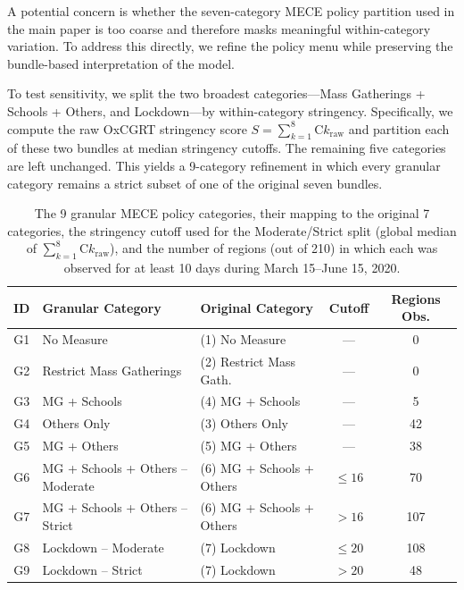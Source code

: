\documentclass[msom,blindrev]{informs3} %
\newcommand{\rev}[1]{{\color{blue}#1}}
\begin{document}
\begin{APPENDICES}
{A potential concern is whether the seven-category MECE policy partition used in the main paper is too coarse and therefore masks meaningful within-category variation. To address this directly, we refine the policy menu while preserving the bundle-based interpretation of the model.

To test sensitivity, we split the two broadest categories---Mass Gatherings + Schools + Others, and Lockdown---by within-category stringency. Specifically, we compute the raw OxCGRT stringency score $S = \sum_{k=1}^{8} \text{C}k_{\text{raw}}$ and partition each of these two bundles at median stringency cutoffs. The remaining five categories are left unchanged. This yields a 9-category refinement in which every granular category remains a strict subset of one of the original seven bundles.


\begin{table}[htbp!]
\centering
{\color{blue}\small
\begin{tabular}{|c|l|l|c|c|}
\hline
\textbf{ID} & \textbf{Granular Category} & \textbf{Original Category} & \textbf{Cutoff} & \textbf{Regions Obs.} \\\hline
G1 & No Measure & (1) No Measure & --- & 0 \\
G2 & Restrict Mass Gatherings & (2) Restrict Mass Gath. & --- & 0 \\
G3 & MG + Schools & (4) MG + Schools & --- & 5 \\
G4 & Others Only & (3) Others Only & --- & 42 \\
G5 & MG + Others & (5) MG + Others & --- & 38 \\
G6 & MG + Schools + Others -- Moderate & (6) MG + Schools + Others & $\leq 16$ & 70 \\
G7 & MG + Schools + Others -- Strict & (6) MG + Schools + Others & $> 16$ & 107 \\
G8 & Lockdown -- Moderate & (7) Lockdown & $\leq 20$ & 108 \\
G9 & Lockdown -- Strict & (7) Lockdown & $> 20$ & 48 \\\hline
\end{tabular}
}
\caption{\rev{The 9 granular MECE policy categories, their mapping to the original 7 categories, the stringency cutoff used for the Moderate/Strict split (global median of $\sum_{k=1}^{8} \text{C}k_{\text{raw}}$), and the number of regions (out of 210) in which each was observed for at least 10 days during March 15--June 15, 2020.}}
\label{tab:granular_policies}
\end{table}

}
\end{APPENDICES}
\end{document}
